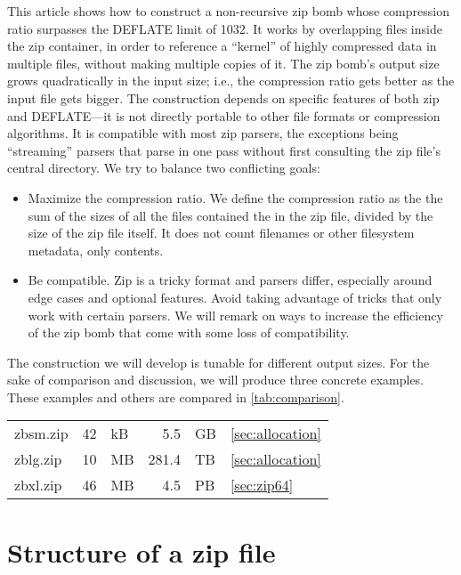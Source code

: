 \documentclass[letterpaper,twocolumn,10pt]{article}
\begin{document}
This article shows how to construct a non-recursive zip bomb
whose compression ratio surpasses the DEFLATE limit of 1032.
It works by overlapping files inside the zip container,
in order to reference a ``kernel'' of highly compressed data
in multiple files, without making multiple copies of it.
The zip bomb's output size grows quadratically in the input size; i.e.,
the compression ratio gets better as the input file gets bigger.
The construction depends on specific features of both zip and DEFLATE---it
is not directly portable to other file formats or compression algorithms.
It is compatible with most zip parsers,
the exceptions being ``streaming'' parsers that
parse in one pass without first consulting the zip file's central directory.
We try to balance
two conflicting goals:
\begin{itemize}
\item
Maximize the compression ratio.
We define the compression ratio as the the sum of the sizes
of all the files contained the in the zip file,
divided by the size of the zip file itself.
It does not count filenames or other filesystem metadata,
only contents.
\item
Be compatible.
Zip is a tricky format and parsers differ, especially
around edge cases and optional features.
Avoid taking advantage of tricks that only work with certain parsers.
We will remark on ways to increase the efficiency of the zip bomb
that come with some loss of compatibility.
\end{itemize}

The construction we will develop is tunable for different output sizes.
For the sake of comparison and discussion,
we will produce three concrete examples.
These examples and others are compared in \autoref{tab:comparison}.

\begin{center}
\begin{tabular}{lr@{~}l@{${} \rightarrow {}$}r@{~}ll}
zbsm.zip & \num{42} & kB & \num{5.5}   & GB & \autoref{sec:allocation} \\
zblg.zip & \num{10} & MB & \num{281.4} & TB & \autoref{sec:allocation} \\
zbxl.zip & \num{46} & MB & \num{4.5}   & PB & \autoref{sec:zip64}
\end{tabular}
\end{center}


\section{Structure of a zip file}
\label{sec:zipstructure}
\end{document}
